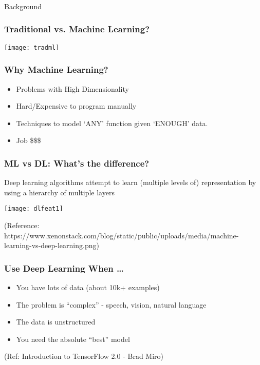 \begin{frame}[fragile]\frametitle{}
\begin{center}
{\Large Background}
\end{center}
\end{frame}

\begin{frame}[fragile]\frametitle{Traditional vs. Machine Learning?}
\begin{center}
\texttt{[image: tradml]}
\end{center}
\end{frame}

\begin{frame}[fragile]\frametitle{Why Machine Learning?}
\begin{itemize}
\item Problems with High Dimensionality
\item Hard/Expensive to program manually
\item Techniques to model `ANY' function given `ENOUGH' data.
\item Job \$\$\$
\end{itemize}
\end{frame}



\begin{frame}[fragile] \frametitle{ML vs DL: What's the difference?}
Deep learning algorithms attempt to learn (multiple levels of) representation by using a hierarchy of multiple layers
\begin{center}
\texttt{[image: dlfeat1]}
\end{center}
\tiny{(Reference: https://www.xenonstack.com/blog/static/public/uploads/media/machine-learning-vs-deep-learning.png)}

\end{frame}

\begin{frame}[fragile] \frametitle{Use Deep Learning When \ldots}

\begin{itemize}
\item You have lots of data (about 10k+ examples)
\item The problem is ``complex'' - speech, vision, natural language
\item The data is unstructured 
\item You need the absolute ``best'' model
\end{itemize}
\tiny{(Ref: Introduction to TensorFlow 2.0 - Brad Miro)}
\end{frame}

